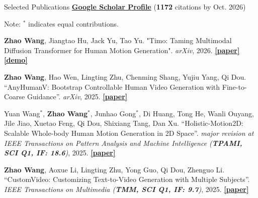 \documentclass[a4paper]{resume} %
\begin{document}
\begin{rSection}{Selected Publications}
\href{https://scholar.google.com/citations?user=1kEufdwAAAAJ}{\bf Google Scholar Profile} ({\bf 1172} citations by Oct. 2026)
\vspace{-0.3em}

Note: {\bf $^*$} indicates equal contributions.

\begin{enumerate}[label={[\arabic*]}, topsep=0em, leftmargin=1.4em, itemsep=-0.5em]

\item {\bf Zhao Wang}, Jiangtao Hu, Jack Yu, Tao Yu. "Timo: Taming Multimodal Diffusion Transformer for Human Motion Generation". {\it arXiv}, 2026. \href{}{\bf [paper]} \href{https://timo.kyfafyd.wang}{\bf [demo]}

\item {\bf Zhao Wang}, Hao Wen, Lingting Zhu, Chenming Shang, Yujiu Yang, Qi Dou. “AnyHumanV: Bootstrap Controllable Human Video Generation with Fine-to-Coarse Guidance”. {\it arXiv}, 2025. \href{https://www.arxiv.org/abs/2502.08189}{\bf [paper]}

\item Yuan Wang$^*$, {\bf Zhao Wang}$^*$, Junhao Gong$^*$, Di Huang, Tong He, Wanli Ouyang, Jile Jiao, Xuetao Feng, Qi Dou, Shixiang Tang, Dan Xu. “Holistic-Motion2D: Scalable Whole-body Human Motion Generation in 2D Space”. {\it major revision at IEEE Transactions on Pattern Analysis and Machine Intelligence ({\bf TPAMI, SCI Q1, IF: 18.6})}, 2025. \href{https://arxiv.org/abs/2406.11253}{\bf [paper]}

\item {\bf Zhao Wang}, Aoxue Li, Lingting Zhu, Yong Guo, Qi Dou, Zhenguo Li. “CustomVideo: Customizing Text-to-Video Generation with Multiple Subjects”. {\it IEEE Transactions on Multimedia ({\bf TMM, SCI Q1, IF: 9.7})}, 2025. \href{https://arxiv.org/abs/2401.09962}{\bf [paper]}



\end{enumerate}
\end{rSection}
\end{document}
